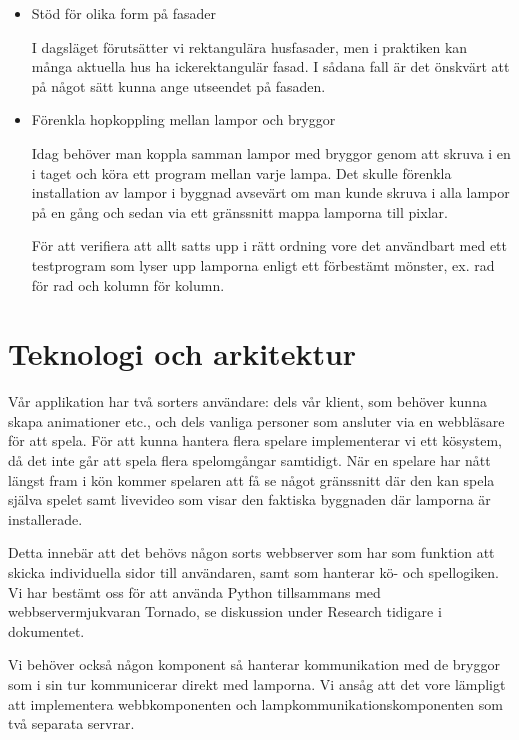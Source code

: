 \documentclass[a4paper,11pt]{article}
\begin{document}
  \begin{itemize}
    \item Stöd för olika form på fasader

          I dagsläget förutsätter vi rektangulära husfasader, men i praktiken kan
          många aktuella hus ha ickerektangulär fasad.  I sådana fall är det
          önskvärt att på något sätt kunna ange utseendet på fasaden.

    \item Förenkla hopkoppling mellan lampor och bryggor

          Idag behöver man koppla samman lampor med bryggor genom att skruva i en
          i taget och köra ett program mellan varje lampa.  Det skulle förenkla
          installation av lampor i byggnad avsevärt om man kunde skruva i alla
          lampor på en gång och sedan via ett gränssnitt mappa lamporna till
          pixlar.

          För att verifiera att allt satts upp i rätt ordning vore det användbart
          med ett testprogram som lyser upp lamporna enligt ett förbestämt
          mönster, ex. rad för rad och kolumn för kolumn.
  \end{itemize}


\section{Teknologi och arkitektur}

  Vår applikation har två sorters användare: dels vår klient, som behöver kunna
  skapa animationer etc., och dels vanliga personer som ansluter via en
  webbläsare för att spela. För att kunna hantera flera spelare implementerar vi
  ett kösystem, då det inte går att spela flera spelomgångar samtidigt. När en
  spelare har nått längst fram i kön kommer spelaren att få se något gränssnitt
  där den kan spela själva spelet samt livevideo som visar den faktiska
  byggnaden där lamporna är installerade.

  Detta innebär att det behövs någon sorts webbserver som har som funktion att
  skicka individuella sidor till användaren, samt som hanterar kö- och
  spellogiken. Vi har bestämt oss för att använda Python tillsammans med
  webbservermjukvaran Tornado, se diskussion under Research tidigare i
  dokumentet.

  Vi behöver också någon komponent så hanterar kommunikation med de bryggor som
  i sin tur kommunicerar direkt med lamporna. Vi ansåg att det vore lämpligt att
  implementera webbkomponenten och lampkommunikationskomponenten som två
  separata servrar.
\end{document}
